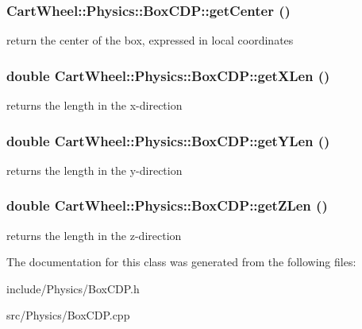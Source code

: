 \hypertarget{classCartWheel_1_1Physics_1_1BoxCDP_ac0818b982e4690ad1fb95f5c88ecb1a2}{
\subsubsection[{getCenter}]{ CartWheel::Physics::BoxCDP::getCenter ()}}
\label{classCartWheel_1_1Physics_1_1BoxCDP_ac0818b982e4690ad1fb95f5c88ecb1a2}
return the center of the box, expressed in local coordinates \hypertarget{classCartWheel_1_1Physics_1_1BoxCDP_ac8a41c6da69e379ab479e825b03cbcb3}{
\subsubsection[{getXLen}]{\setlength{\rightskip}{0pt plus 5cm}double CartWheel::Physics::BoxCDP::getXLen ()}}
\label{classCartWheel_1_1Physics_1_1BoxCDP_ac8a41c6da69e379ab479e825b03cbcb3}
returns the length in the x-\/direction \hypertarget{classCartWheel_1_1Physics_1_1BoxCDP_a3536b20411f1534c608f917cf950ba17}{
\subsubsection[{getYLen}]{\setlength{\rightskip}{0pt plus 5cm}double CartWheel::Physics::BoxCDP::getYLen ()}}
\label{classCartWheel_1_1Physics_1_1BoxCDP_a3536b20411f1534c608f917cf950ba17}
returns the length in the y-\/direction \hypertarget{classCartWheel_1_1Physics_1_1BoxCDP_aa6d43bb822464cf18cc8164dc2942c38}{
\subsubsection[{getZLen}]{\setlength{\rightskip}{0pt plus 5cm}double CartWheel::Physics::BoxCDP::getZLen ()}}
\label{classCartWheel_1_1Physics_1_1BoxCDP_aa6d43bb822464cf18cc8164dc2942c38}
returns the length in the z-\/direction 

The documentation for this class was generated from the following files:\begin{DoxyCompactItemize}
\item 
include/Physics/BoxCDP.h\item 
src/Physics/BoxCDP.cpp\end{DoxyCompactItemize}
